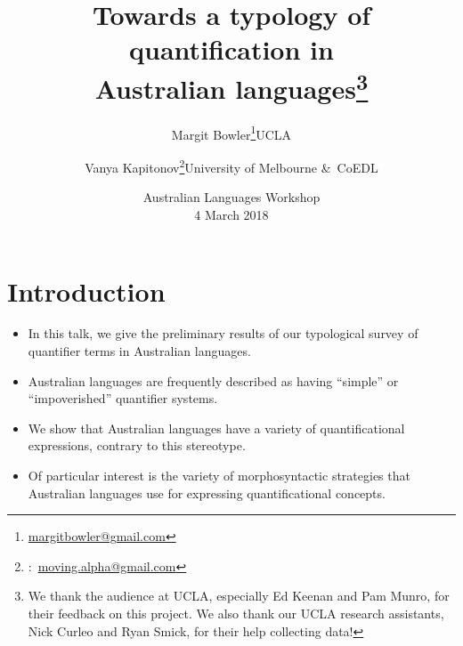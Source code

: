 \documentclass{article}
\title{Towards a typology of quantification in\\ Australian languages\thanks{We thank the audience at UCLA, especially Ed Keenan and Pam Munro, for their feedback on this project. We also thank our UCLA research assistants, Nick Curleo and Ryan Smick, for their help collecting data!}}
\author{Margit Bowler\thanks{\href{mailto:margitbowler@gmail.com}{margitbowler@gmail.com}}\authorcr UCLA \and \vspace{-.5cm}Vanya Kapitonov\thanks{\Letter:~\href{mailto:moving.alpha@gmail.com}{moving.alpha@gmail.com}}\authorcr University of Melbourne \&\ CoEDL}
\date{Australian Languages Workshop\\4 March 2018}
\begin{document}
\maketitle


\section[Introduction]{Introduction}
\begin{itemize}
    \item In this talk, we give the preliminary results of our typological survey of quantifier terms in Australian languages.
    \item Australian languages are  frequently described as having ``simple'' or ``impoverished'' quantifier systems. %
    \item We show that Australian languages have a variety of quantificational expressions, contrary to this stereotype.
    \item Of particular interest is the variety of morphosyntactic strategies that Australian languages use for expressing quantificational concepts.
\end{itemize}
\end{document}
